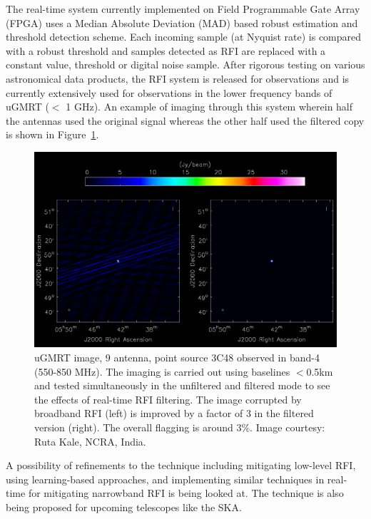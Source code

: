 \begin{itemize}
The real-time system currently implemented on Field Programmable Gate Array (FPGA) \citep{buch2019real} uses a Median Absolute Deviation (MAD) based robust estimation and threshold detection scheme. Each incoming sample (at Nyquist rate) is compared with a robust threshold and samples detected as RFI are replaced with a constant value, threshold or digital noise sample. After rigorous testing on various astronomical data products, the RFI system is released for observations and is currently extensively used for observations in the lower frequency bands of uGMRT ($<$ 1 GHz). An example of imaging through this system wherein half the antennas used the original signal whereas the other half used the filtered copy \citep{buch2022performance} is shown in Figure~\ref{fig:ugmrt-b4-image}. 

\begin{figure}
    \includegraphics[scale=0.4]{Hardware Excision Techniques/figures/band4_point_source_rfi_filtering.png}
    \caption{uGMRT image, 9 antenna, point source 3C48 observed in band-4 (550-850 MHz). The imaging is carried out using baselines $<$0.5km and tested simultaneously in the unfiltered and filtered mode to see the effects of real-time RFI filtering. The image corrupted by broadband RFI (left) is improved by a factor of 3 in the filtered version (right). The overall flagging is around 3\%. Image courtesy: Ruta Kale, NCRA, India.
}
    \label{fig:ugmrt-b4-image}
\end{figure}

A possibility of refinements to the technique including mitigating low-level RFI, using learning-based approaches, and implementing similar techniques in real-time for mitigating narrowband RFI \citep{buch2016towards, buch2016real} is being looked at. The technique is also being proposed \citep{buch2023real}for upcoming telescopes like the SKA. %


\end{itemize}
